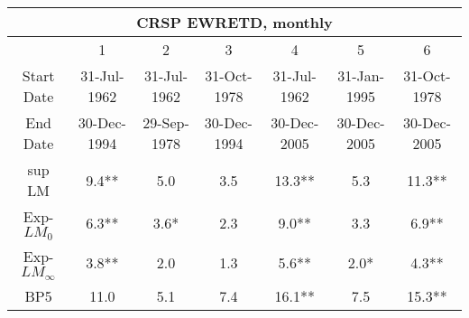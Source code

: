 \begin{table}[H] 
 \tiny 
 \centering 
\begin{tabular}{|c|c|c|c|c|c|c|} %
\multicolumn{7}{c}{ \cite{NankervisSavin2010} CRSP EWRETD, monthly } \\ 
 \hline 
 &  1  &  2  &  3  &  4  &  5  &  6  \\ %
 Start Date &  31-Jul-1962 &  31-Jul-1962 &  31-Oct-1978 &  31-Jul-1962 &  31-Jan-1995 &  31-Oct-1978  \\ %
 End Date &  30-Dec-1994 &  29-Sep-1978 &  30-Dec-1994 &  30-Dec-2005 &  30-Dec-2005 &  30-Dec-2005  \\ %
\hline
sup LM & 9.4** & 5.0 & 3.5 & 13.3** & 5.3 & 11.3** \\ %
Exp-$LM_{0}$ & 6.3** & 3.6* & 2.3 & 9.0** & 3.3 & 6.9** \\
Exp-$LM_{\infty}$ & 3.8** & 2.0 & 1.3 & 5.6** & 2.0* & 4.3** \\
BP5 & 11.0 & 5.1 & 7.4 & 16.1** & 7.5 & 15.3** \\
\hline 
\end{tabular}
 \end{table}
